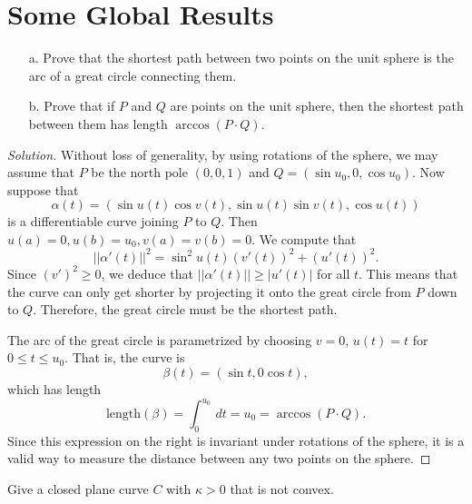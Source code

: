 \documentclass[Shifrin_Solutions_Spring_2015]{subfiles}
\begin{document}
\section{Some Global Results}

\begin{exercise}
\begin{itemize}
\item[a.] Prove that the shortest path between two points on the unit sphere is the arc of a great circle connecting them.
\item[b.] Prove that if $P$ and $Q$ are points on the unit sphere, then the shortest path between them has length $\arccos(P\cdot Q)$.
\end{itemize}
\end{exercise}


\begin{proof}[Solution] Without loss of generality, by using rotations of the sphere, we may assume that $P$ be the north pole $(0,0,1)$ and $Q = (\sin u_0, 0 , \cos u_0)$. Now suppose that
\[
\alpha(t) = \left( \sin u(t) \cos v(t) , \sin u(t) \sin v(t) , \cos u(t) \right)
\]
is a differentiable curve joining $P$ to $Q$. Then $u(a)  = 0, u(b)=u_0, v(a)=v(b) =0$. We compute that
\[
||\alpha'(t)||^2 = \sin^2 u(t) (v'(t))^2 + (u'(t))^2 .
\]
Since $(v')^2\geq 0$, we deduce that $||\alpha'(t)|| \geq |u'(t)|$ for all $t$. This means that the curve can only get shorter by projecting it onto the great circle from $P$ down to $Q$. Therefore, the great circle must be the shortest path.

The arc of the great circle is parametrized by choosing $v=0$, $u(t) = t$ for $0 \leq t \leq u_0$. That is, the curve is
\[
\beta(t) = \left(\sin t, 0 \cos t \right),
\]
which has length
\[
\mathrm{length}(\beta) = \int_0^{u_0} \, dt = u_0 = \arccos(P\cdot Q).
\]
Since this expression on the right is invariant under rotations of the sphere, it is a valid way to measure the distance between any two points on the sphere.
\end{proof}

\begin{exercise} Give a closed plane curve $C$ with $\kappa>0$ that is not convex.
\end{exercise}
\end{document}
